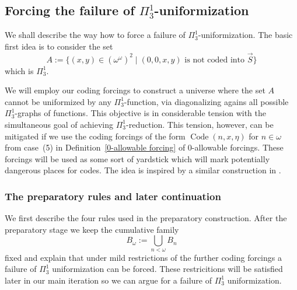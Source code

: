 \documentclass[a4paper,11pt]{article}
\begin{document}
\subsection{Forcing the failure of \texorpdfstring{$\Pi^1_3$}{Pi13}-uniformization}
We shall describe the way how to force a failure of $\Pi^1_3$-uniformization.
The basic first idea is to consider the set
\[
A:= \{ (x,y) \in (\omega^{\omega})^2 \mid (0,0,x,y) \text{ is not coded into $\vec{S}$} \}
\]
which is $\Pi^1_3$.

We will employ our coding forcings to construct a universe where the set $A$ cannot be uniformized by any $\Pi^1_3$-function, via diagonalizing agains all possible $\Pi^1_3$-graphs of functions. This objective is in considerable tension with the simultaneous goal of achieving $\Pi^1_3$-reduction. This tension, however, can be mitigated if we use the coding forcings of the form $\operatorname{Code}(n,x,\eta)$ for $n\in\omega$ from case~(5) in Definition~\ref{0-allowable forcing} of $0$-allowable forcings. These forcings will be used as some sort of yardstick which will mark potentially dangerous places for codes. The idea is inspired by a similar construction in \cite{Separation}.

\subsubsection{The preparatory rules and later continuation}
We first describe the four rules used in the preparatory construction. After the preparatory stage we keep the cumulative family
\[
B_\omega:=\bigcup_{n<\omega}B_n
\]
fixed and explain that under mild restrictions of the further coding forcings a failure of $\Pi^1_3$ uniformization can be forced. These restricitions will be satisfied later in our main iteration so we can argue for a failure of $\Pi^1_3$ uniformization. 
\end{document}
